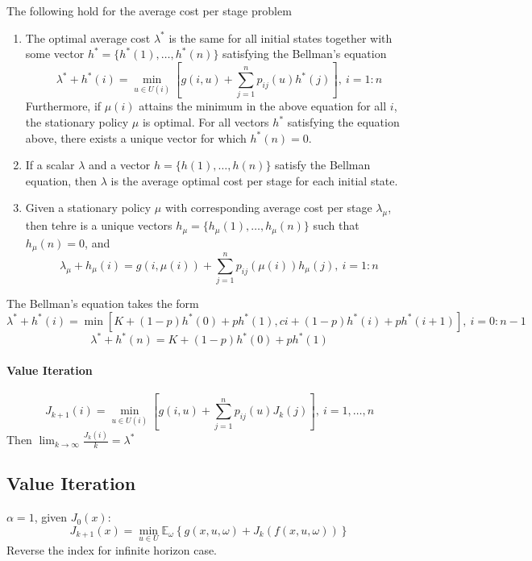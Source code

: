 \begin{proposition}
The following hold for the average cost per stage problem
\begin{enumerate}
\item
The optimal average cost $\lambda^*$ is the same for all initial states together with some vector $h^*=\{h^*(1),\dots,h^*(n)\}$ satisfying the Bellman's equation
\begin{equation}
\lambda^*+h^*(i) = \min_{u\in U(i)}\left[g(i,u)+\sum_{j=1}^np_{ij}(u)h^*(j)\right],\ i=1:n
\end{equation}
Furthermore, if $\mu(i)$ attains the minimum in the above equation for all $i$, the stationary policy $\mu$ is optimal. For all vectors $h^*$ satisfying the equation above, there exists a unique vector for which $h^*(n)=0$.
\item
If a scalar $\lambda$ and a vector $h=\{h(1),\dots,h(n)\}$ satisfy the Bellman equation, then $\lambda$ is the average optimal cost per stage for each initial state.
\item
Given a stationary policy $\mu$ with corresponding average cost per stage $\lambda_{\mu}$, then tehre is a unique vectors $h_{\mu}=\{h_\mu(1),\dots,h_\mu(n)\}$ such that $h_\mu(n)=0$, and
\[
\lambda_\mu+h_\mu(i)=g(i,\mu(i))+\sum_{j=1}^np_{ij}(\mu(i))h_\mu(j),\ i=1:n
\]

\end{enumerate}
\end{proposition}

\begin{example}
The Bellman's equation takes the form
\[
\lambda^*+h^*(i)=\min[K+(1-p)h^*(0)+ph^*(1),ci+(1-p)h^*(i)+ph^*(i+1)],\ i=0:n-1
\]
\[
\lambda^*+h^*(n) = K+(1-p)h^*(0)+ph^*(1)
\]
\end{example}


\paragraph{Value Iteration}
\[
J_{k+1}(i)=\min_{u\in U(i)}\left[g(i,u)+\sum_{j=1}^np_{ij}(u)J_k(j)\right],\ i=1,\dots,n
\]
Then $\lim_{k\to\infty}\frac{J_k(i)}{k}=\lambda^*$









\subsection{Value Iteration}
$\alpha=1$, given $J_0(x)$:
\[
J_{k+1}(x) = \min_{u\in U}\mathbb{E}_\omega
\left\{
g(x,u,\omega)+J_k(f(x,u,\omega))
\right\}
\]
Reverse the index for infinite horizon case.

